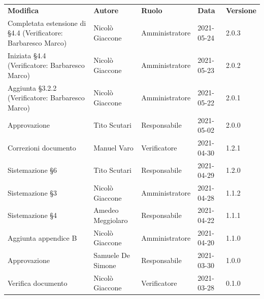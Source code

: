 \documentclass[a4paper]{article}
\begin{document}
\begin{center}
\begin{table}[h!]
    \centering
    \renewcommand{\arraystretch}{1.8}
    \begin{tabular}{p{160px} p{90px} p{70px} p{55px} p{45px}}
        \rowcolor{logo!70} \textbf{Modifica}                          & \textbf{Autore}   & \textbf{Ruolo} & \textbf{Data} & \textbf{Versione} \\
        Completata estensione di \S 4.4   \newline(Verificatore: Barbaresco Marco)                              & Nicolò Giaccone   & Amministratore   & 2021-05-24    & 2.0.3           \\
        Iniziata \S 4.4   \newline(Verificatore: Barbaresco Marco)                                              & Nicolò Giaccone   & Amministratore   & 2021-05-23    & 2.0.2           \\
        Aggiunta \S 3.2.2 \newline(Verificatore: Barbaresco Marco)                                              & Nicolò Giaccone   & Amministratore   & 2021-05-22    & 2.0.1           \\
        Approvazione                                                  & Tito Scutari      & Responsabile   & 2021-05-02    & 2.0.0             \\
        Correzioni documento                                          & Manuel Varo       & Verificatore   & 2021-04-30    & 1.2.1             \\
        Sistemazione \S 6                                             & Tito Scutari      & Responsabile   & 2021-04-29    & 1.2.0             \\
        Sistemazione \S 3                                             & Nicolò Giaccone   & Amministratore & 2021-04-28    & 1.1.2             \\
        Sistemazione \S 4                                             & Amedeo Meggiolaro & Responsabile   & 2021-04-22    & 1.1.1             \\
        Aggiunta appendice B                                          & Nicolò Giaccone   & Amministratore & 2021-04-20    & 1.1.0             \\
        Approvazione                                                  & Samuele De Simone & Responsabile   & 2021-03-30    & 1.0.0             \\
        Verifica documento                                            & Nicolò Giaccone   & Verificatore   & 2021-03-28    & 0.1.0             \\

\end{tabular}
\end{table}
\end{center}
\end{document}
